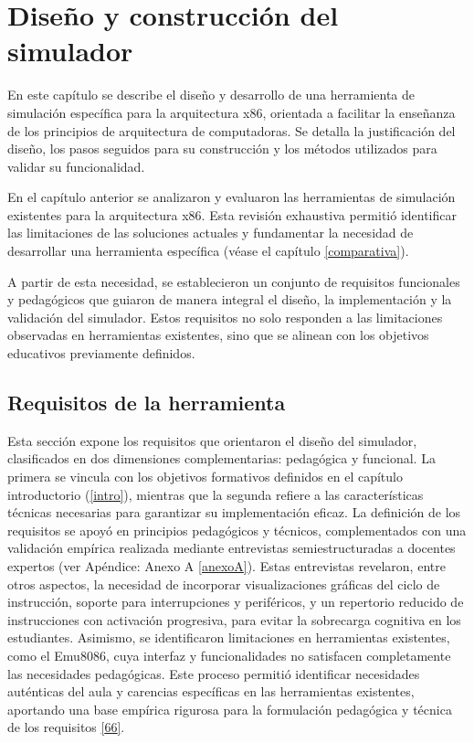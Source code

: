 \documentclass[12pt,oneside]{templates/unerthesis}
\begin{document}
\hypertarget{desarrollo}{%
\chapter{Diseño y construcción del simulador}\label{desarrollo}}

En este capítulo se describe el diseño y desarrollo de una herramienta de simulación específica para la arquitectura x86, orientada a facilitar la enseñanza de los principios de arquitectura de computadoras. Se detalla la justificación del diseño, los pasos seguidos para su construcción y los métodos utilizados para validar su funcionalidad.

En el capítulo anterior se analizaron y evaluaron las herramientas de simulación existentes para la arquitectura x86. Esta revisión exhaustiva permitió identificar las limitaciones de las soluciones actuales y fundamentar la necesidad de desarrollar una herramienta específica (véase el capítulo \ref{comparativa}).

A partir de esta necesidad, se establecieron un conjunto de requisitos funcionales y pedagógicos que guiaron de manera integral el diseño, la implementación y la validación del simulador. Estos requisitos no solo responden a las limitaciones observadas en herramientas existentes, sino que se alinean con los objetivos educativos previamente definidos.

\hypertarget{requisitos-de-la-herramienta}{%
\section{Requisitos de la herramienta}\label{requisitos-de-la-herramienta}}

Esta sección expone los requisitos que orientaron el diseño del simulador, clasificados en dos dimensiones complementarias: pedagógica y funcional. La primera se vincula con los objetivos formativos definidos en el capítulo introductorio (\ref{intro}), mientras que la segunda refiere a las características técnicas necesarias para garantizar su implementación eficaz. La definición de los requisitos se apoyó en principios pedagógicos y técnicos, complementados con una validación empírica realizada mediante entrevistas semiestructuradas a docentes expertos (ver Apéndice: Anexo A \ref{anexoA}). Estas entrevistas revelaron, entre otros aspectos, la necesidad de incorporar visualizaciones gráficas del ciclo de instrucción, soporte para interrupciones y periféricos, y un repertorio reducido de instrucciones con activación progresiva, para evitar la sobrecarga cognitiva en los estudiantes. Asimismo, se identificaron limitaciones en herramientas existentes, como el Emu8086, cuya interfaz y funcionalidades no satisfacen completamente las necesidades pedagógicas. Este proceso permitió identificar necesidades auténticas del aula y carencias específicas en las herramientas existentes, aportando una base empírica rigurosa para la formulación pedagógica y técnica de los requisitos \protect\hyperlink{ref-huberman2019qualitative}{{[}66{]}}.
\end{document}

